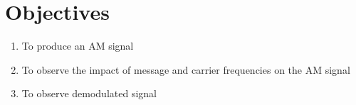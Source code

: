 \section*{Objectives}
\begin{enumerate}
    \item To produce an AM signal
    \item To observe the impact of message and carrier frequencies on the AM signal
    \item To observe demodulated signal 
\end{enumerate}